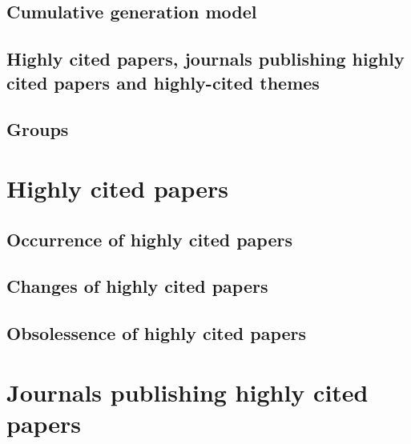 \documentclass[12pt,a4paper,twocolumn,twoside]{ujsikpb}
\begin{document}
\subsection{Cumulative generation model}
%



\subsection{Highly cited papers, journals publishing highly cited papers and highly-cited themes}
%



\subsection{Groups}
%


\section{Highly cited papers}
\subsection{Occurrence of highly cited papers}

%


\subsection{Changes of highly cited papers}
%

%




\subsection{Obsolessence of highly cited papers}
%

%


%

%





\section{Journals publishing highly cited papers}
%

\end{document}
